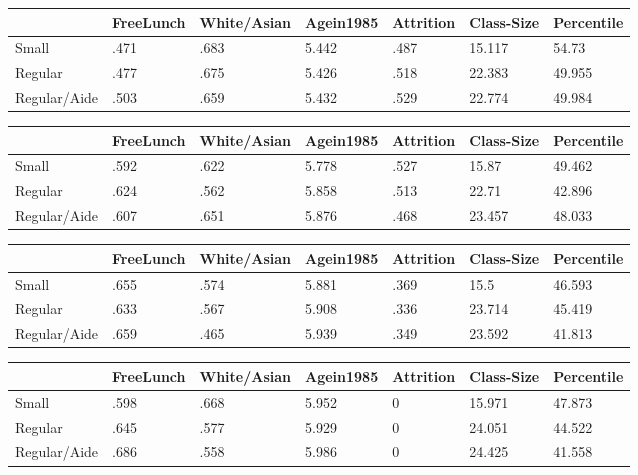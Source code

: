 \documentclass[a4paper,11pt]{article}
\begin{document}
\begin{table}[htbp]
\begin{tabular}{lllllll} \hline \hline
 & FreeLunch  & White/Asian  & Agein1985  & Attrition  & Class-Size  & Percentile  \\  \hline 
Small & .471 & .683 & 5.442 & .487 & 15.117 & 54.73 \\  
Regular & .477 & .675 & 5.426 & .518 & 22.383 & 49.955 \\  
Regular/Aide & .503 & .659 & 5.432 & .529 & 22.774 & 49.984 \\  
\hline \hline \end{tabular}
\end{table}

\begin{table}[htbp]
	\begin{tabular}{lllllll} \hline \hline
		& FreeLunch  & White/Asian  & Agein1985  & Attrition  & Class-Size  & Percentile  \\  \hline 
		Small & .592 & .622 & 5.778 & .527 & 15.87 & 49.462 \\  
		Regular & .624 & .562 & 5.858 & .513 & 22.71 & 42.896 \\  
		Regular/Aide & .607 & .651 & 5.876 & .468 & 23.457 & 48.033 \\  
		\hline \hline \end{tabular}
\end{table}

\begin{table}[htbp]
	\begin{tabular}{lllllll} \hline \hline
		& FreeLunch  & White/Asian  & Agein1985  & Attrition  & Class-Size  & Percentile  \\  \hline 
		Small & .655 & .574 & 5.881 & .369 & 15.5 & 46.593 \\  
		Regular & .633 & .567 & 5.908 & .336 & 23.714 & 45.419 \\  
		Regular/Aide & .659 & .465 & 5.939 & .349 & 23.592 & 41.813 \\  
		\hline \hline \end{tabular}
\end{table}

\begin{table}[htbp]
	\begin{tabular}{lllllll} \hline \hline
		& FreeLunch  & White/Asian  & Agein1985  & Attrition  & Class-Size  & Percentile  \\  \hline 
		Small & .598 & .668 & 5.952 & 0 & 15.971 & 47.873 \\  
		Regular & .645 & .577 & 5.929 & 0 & 24.051 & 44.522 \\  
		Regular/Aide & .686 & .558 & 5.986 & 0 & 24.425 & 41.558 \\  
		\hline \hline \end{tabular}
\end{table}
\end{document}
